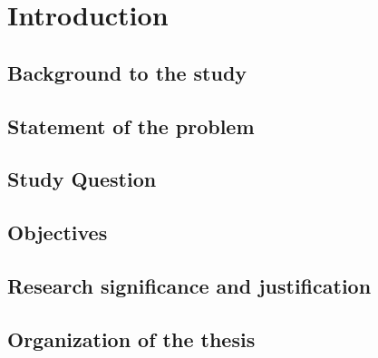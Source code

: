 \label{chapter1}

\chapter{Introduction}
\section{Background to the study}


\section{Statement of the problem}


\section{Study Question}


\section{Objectives}


\section{Research significance and justification}


\section{Organization of the thesis}

